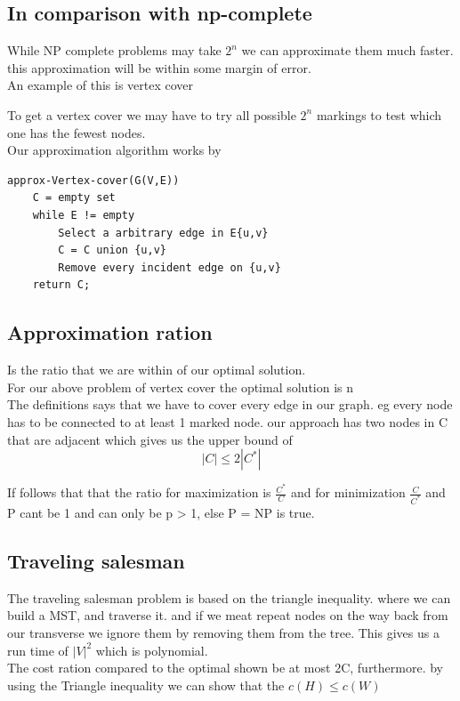 \documentclass[a4paper,10pt,titlepage]{report}
\begin{document}
\subsection{In comparison with np-complete}

While NP complete problems may take $2^n$ we can approximate them much faster. this approximation will be within some margin of error.\\
An example of this is vertex cover\

To get a vertex cover we may have to try all possible $2^n$ markings to test which one has the fewest nodes.\\

Our approximation algorithm works by \\
\begin{lstlisting}
approx-Vertex-cover(G(V,E))
	C = empty set
	while E != empty
		Select a arbitrary edge in E{u,v}
		C = C union {u,v}
		Remove every incident edge on {u,v}
	return C;
\end{lstlisting}
\subsection{Approximation ration}
Is the ratio that we are within of our optimal solution.\\

For our above problem of vertex cover the optimal solution is n\\

The definitions says that we have to cover every edge in our graph. eg every node has to be connected to at least 1 marked node. our approach has two nodes in C that are adjacent which gives us the upper bound of
\begin{equation}
|C| \leq 2|C^*|
\end{equation}

If follows that that the ratio for maximization is $\frac{C^*}{C}$ and for minimization $\frac{C}{C^*}$ and P cant be 1 and can only be p > 1, else P = NP is true.\\

\subsection{Traveling salesman}

The traveling salesman problem is based on the triangle inequality. where we can build a MST, and traverse it. and if we meat repeat nodes on the way back from our transverse we ignore them by removing them from the tree. This gives us a run time of $|V|^2$ which is polynomial.\\
The cost ration compared to the optimal shown be at most 2C, furthermore. by using the Triangle inequality we can show that the $c(H) \leq c(W)$\\
\end{document}
